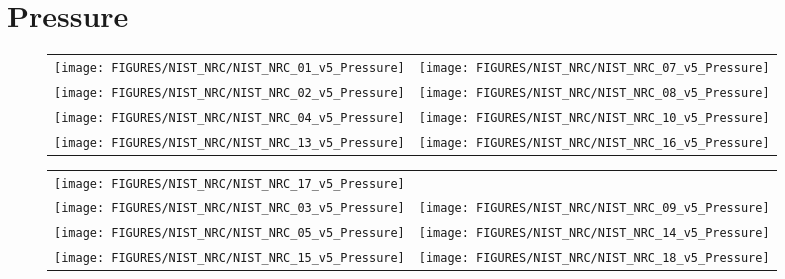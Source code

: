 \chapter{Pressure}





\begin{figure}[h]
\begin{tabular*}{\textwidth}{l@{\extracolsep{\fill}}r}
\texttt{[image: FIGURES/NIST\_NRC/NIST\_NRC\_01\_v5\_Pressure]} &
\texttt{[image: FIGURES/NIST\_NRC/NIST\_NRC\_07\_v5\_Pressure]} \\
\texttt{[image: FIGURES/NIST\_NRC/NIST\_NRC\_02\_v5\_Pressure]} &
\texttt{[image: FIGURES/NIST\_NRC/NIST\_NRC\_08\_v5\_Pressure]} \\
\texttt{[image: FIGURES/NIST\_NRC/NIST\_NRC\_04\_v5\_Pressure]} &
\texttt{[image: FIGURES/NIST\_NRC/NIST\_NRC\_10\_v5\_Pressure]} \\
\texttt{[image: FIGURES/NIST\_NRC/NIST\_NRC\_13\_v5\_Pressure]} &
\texttt{[image: FIGURES/NIST\_NRC/NIST\_NRC\_16\_v5\_Pressure]}
\end{tabular*}
\label{NIST_NRC_Pressure_Closed}
\end{figure}

\begin{figure}[p]
\begin{tabular*}{\textwidth}{l@{\extracolsep{\fill}}r}
\texttt{[image: FIGURES/NIST\_NRC/NIST\_NRC\_17\_v5\_Pressure]} &
   \\
\texttt{[image: FIGURES/NIST\_NRC/NIST\_NRC\_03\_v5\_Pressure]} &
\texttt{[image: FIGURES/NIST\_NRC/NIST\_NRC\_09\_v5\_Pressure]} \\
\texttt{[image: FIGURES/NIST\_NRC/NIST\_NRC\_05\_v5\_Pressure]} &
\texttt{[image: FIGURES/NIST\_NRC/NIST\_NRC\_14\_v5\_Pressure]} \\
\texttt{[image: FIGURES/NIST\_NRC/NIST\_NRC\_15\_v5\_Pressure]} &
\texttt{[image: FIGURES/NIST\_NRC/NIST\_NRC\_18\_v5\_Pressure]}
\end{tabular*}
\label{NIST_NRC_Pressure_Open}
\end{figure}

\clearpage
